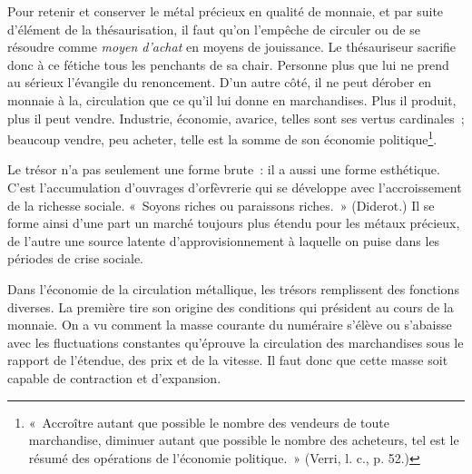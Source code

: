 \documentclass[french,twoside]{book} %
\begin{document}
Pour retenir et conserver le métal précieux en qualité de monnaie, et par suite d’élément de la thésaurisation, il faut qu’on l’empêche de circuler ou de se résoudre comme \emph{moyen d’achat} en moyens de jouissance. Le thésauriseur sacrifie donc à ce fétiche tous les penchants de sa chair. Personne plus que lui ne prend au sérieux l’évangile du renoncement. D’un autre côté, il ne peut dérober en monnaie à la, circulation que ce qu’il lui donne en marchandises. Plus il produit, plus il peut vendre. Industrie, économie, avarice, telles sont ses vertus cardinales ; beaucoup vendre, peu acheter, telle est la somme de son économie politique\footnote{« Accroître autant que possible le nombre des vendeurs de toute marchandise, diminuer autant que possible le nombre des acheteurs, tel est le résumé des opérations de l’économie politique. » (Verri, l. c., p. 52.)}.\par
Le trésor n’a pas seulement une forme brute : il a aussi une forme esthétique. C’est l’accumulation d’ouvrages d’orfèvrerie qui se développe avec l’accroissement de la richesse sociale. « Soyons riches ou paraissons riches. » (Diderot.) Il se forme ainsi d’une part un marché toujours plus étendu pour les métaux précieux, de l’autre une source latente d’approvisionnement à laquelle on puise dans les périodes de crise sociale.\par
Dans l’économie de la circulation métallique, les trésors remplissent des fonctions diverses. La première tire son origine des conditions qui président au cours de la monnaie. On a vu comment la masse courante du numéraire s’élève ou s’abaisse avec les fluctuations constantes qu’éprouve la circulation des marchandises sous le rapport de l’étendue, des prix et de la vitesse. Il faut donc que cette masse soit capable de contraction et d’expansion.\par
\end{document}
